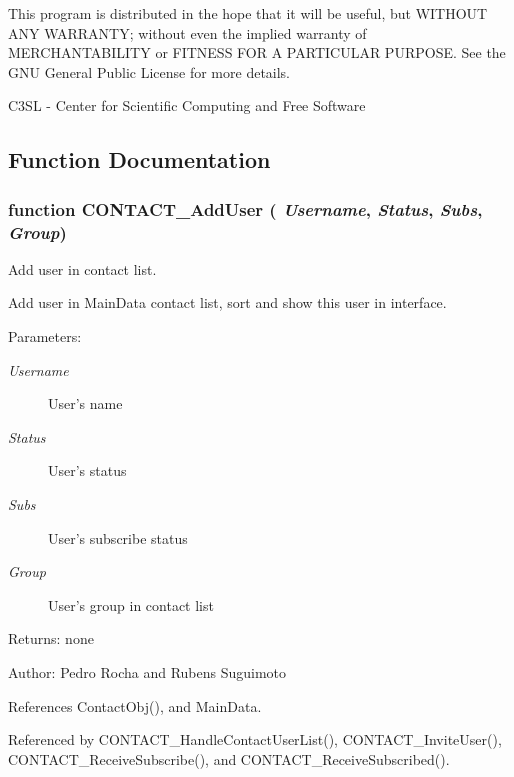 This program is distributed in the hope that it will be useful, but WITHOUT ANY WARRANTY; without even the implied warranty of MERCHANTABILITY or FITNESS FOR A PARTICULAR PURPOSE. See the GNU General Public License for more details.

C3SL - Center for Scientific Computing and Free Software 

\subsection{Function Documentation}
\subsubsection[CONTACT\_\-AddUser]{\setlength{\rightskip}{0pt plus 5cm}function CONTACT\_\-AddUser ( {\em Username}, \/   {\em Status}, \/   {\em Subs}, \/   {\em Group})}\label{contact_2contact_8js_03d212c103b133c0f2eb7ac8beb2df42}


Add user in contact list. 

Add user in MainData contact list, sort and show this user in interface.

\begin{Desc}
\item[Parameters:]
\begin{description}
\item[{\em Username}]User's name \item[{\em Status}]User's status \item[{\em Subs}]User's subscribe status \item[{\em Group}]User's group in contact list \end{description}
\end{Desc}
\begin{Desc}
\item[Returns:]none \end{Desc}
\begin{Desc}
\item[Author:]Pedro Rocha and Rubens Suguimoto \end{Desc}


References ContactObj(), and MainData.

Referenced by CONTACT\_\-HandleContactUserList(), CONTACT\_\-InviteUser(), CONTACT\_\-ReceiveSubscribe(), and CONTACT\_\-ReceiveSubscribed().
